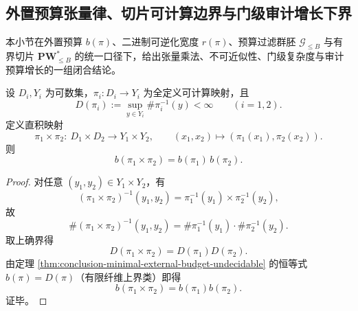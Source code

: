 \subsection{外置预算张量律、切片可计算边界与门级审计增长下界}\label{subsec:conclusion-budget-tensor-slice-obstruction-gate-metric-growth}
本小节在外置预算 \(b(\pi)\)、二进制可逆化宽度 \(r(\pi)\)、预算过滤群胚 \(\mathcal G_{\le B}\) 与有界切片 \(\mathbf{PW}^{\ast}_{\le B}\) 的统一口径下，给出张量乘法、不可近似性、门级复杂度与审计预算增长的一组闭合结论。

\begin{proposition}[外置预算的张量乘法律]\label{prop:conclusion-external-budget-tensor-multiplicativity}
设 \(D_i,Y_i\) 为可数集，\(\pi_i:D_i\to Y_i\) 为全定义可计算映射，且
\[
D(\pi_i):=\sup_{y\in Y_i}\#\pi_i^{-1}(y)<\infty\qquad(i=1,2).
\]
定义直积映射
\[
\pi_1\times\pi_2:\ D_1\times D_2\to Y_1\times Y_2,\qquad
(x_1,x_2)\mapsto(\pi_1(x_1),\pi_2(x_2)).
\]
则
\[
b(\pi_1\times\pi_2)=b(\pi_1)\,b(\pi_2).
\]
\end{proposition}
\begin{proof}
对任意 \((y_1,y_2)\in Y_1\times Y_2\)，有
\[
(\pi_1\times\pi_2)^{-1}(y_1,y_2)
=\pi_1^{-1}(y_1)\times\pi_2^{-1}(y_2),
\]
故
\[
\#(\pi_1\times\pi_2)^{-1}(y_1,y_2)
=\#\pi_1^{-1}(y_1)\cdot\#\pi_2^{-1}(y_2).
\]
取上确界得
\[
D(\pi_1\times\pi_2)=D(\pi_1)D(\pi_2).
\]
由定理 \ref{thm:conclusion-minimal-external-budget-undecidable} 的恒等式 \(b(\pi)=D(\pi)\)（有限纤维上界类）即得
\[
b(\pi_1\times\pi_2)=b(\pi_1)b(\pi_2).
\]
证毕。
\end{proof}



